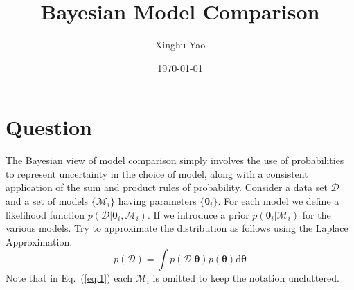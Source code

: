 \documentclass{article}
\title{Bayesian Model Comparison}
\author{Xinghu Yao}
\date{\today}
\begin{document}
	\maketitle
	\section{Question}
	The Bayesian view of model comparison simply involves the use of probabilities to represent uncertainty in the choice of model, along with a consistent application of the sum and product rules of probability.
	Consider a data set $\mathcal{D}$ and a set of models $\{\mathcal{M}_i\}$ having parameters $\{\boldsymbol{\theta}_i\}$. For each model we define a likelihood function $p(\mathcal{D}|\boldsymbol{\theta}_i,\mathcal{M}_i)$. If we introduce a prior $p(\boldsymbol{\theta}_i|\mathcal{M}_i)$ for the various models. Try to approximate the distribution as follows using the Laplace Approximation. 
	\begin{equation}
	p(\mathcal{D})=\int p(\mathcal{D}|\boldsymbol{\theta})p(\boldsymbol{\theta}) \text{d}\boldsymbol{\theta}\label{eq:1}
	\end{equation}
	Note that in Eq.~(\ref{eq:1}) each $\mathcal{M}_i$ is omitted to keep the notation uncluttered. 
\end{document}
